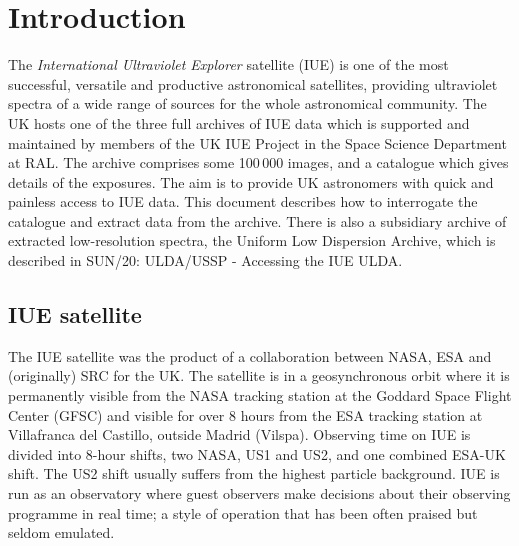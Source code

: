 \documentclass[11pt,twoside]{article}
\newcommand{\stardocinitials}  {SUN}
\newcommand{\stardocnumber}    {58.7}
\newcommand{\stardocname}{\stardocinitials /\stardocnumber}
\newenvironment{latexonly}{}{}
\newcommand{\xref}[3]{#1}
\newcommand{\xlabel}[1]{}
\renewcommand{\thepage}{\roman{page}}
\begin{document}
\newpage
\begin{latexonly}
   \setlength{\parskip}{0mm}
   \tableofcontents
   \setlength{\parskip}{\medskipamount}
   \markright{\stardocname}
\end{latexonly}
\newpage
\renewcommand{\thepage}{\arabic{page}}
\setcounter{page}{1}

\section {Introduction\xlabel{introduction}}

The {\it International Ultraviolet Explorer\/} satellite (IUE) is one of the
most successful, versatile and productive astronomical satellites, providing
ultraviolet spectra of a wide range of sources for the whole astronomical
community.
The UK hosts one of the three full archives of IUE data
which is supported and maintained by members of the UK IUE 
Project in the Space Science Department at RAL. 
The archive comprises some 100\,000 images,
and a catalogue which gives details of the exposures. 
The aim is to provide UK astronomers with quick and painless 
access to IUE data.
This document describes how to interrogate the catalogue and extract data from
the archive. 
There is also a subsidiary archive of extracted low-resolution spectra, the 
Uniform Low Dispersion Archive,
which is described in 
\xref{SUN/20}{sun20}{}: ULDA/USSP - Accessing the IUE ULDA.

\subsection {IUE satellite}
The IUE satellite was the product
of a collaboration between NASA, ESA and (originally) SRC for the UK.
The satellite is in a geosynchronous orbit where it is permanently visible from
the NASA tracking station at the Goddard Space Flight Center (GFSC) and visible
for over 8 hours from the ESA tracking station at Villafranca del Castillo,
outside Madrid (Vilspa).
Observing time on IUE is divided into 8-hour shifts, two NASA, US1
and US2, and one combined ESA-UK shift.
The US2 shift usually suffers from the highest particle background.
IUE is run as an observatory where guest observers make decisions 
about their observing programme in real time; a style of operation 
that has been often praised but seldom emulated.
\end{document}
